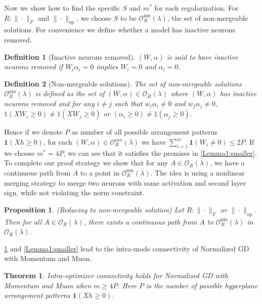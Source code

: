 \documentclass{article}
\newtheorem{theorem}{Theorem}[section]
\newtheorem{proposition}{Proposition}[section]
\newtheorem{definition}{Definition}[section]
\newcommand{\op}{\mathrm{op}}
\newcommand{\nm}{\mathrm{nm}}      %
\begin{document}
Now we show how to find the specific $S$ and $m^*$ for each regularization. For $R: \|\cdot\|_F$ and $\|\cdot\|_{\op}$, we choose $S$ to be $\mathcal{O}_R^{\nm}(\lambda)$, the set of non-mergeable solutions. For convenience we define whether a model has inactive neurons removed.
\begin{definition}[Inactive neurons removed]
$(W,\alpha)$ is said to have \emph{inactive neurons removed} if
\(W_i \alpha_i = 0\) implies \(W_i = 0\) and \(\alpha_i = 0\).
\end{definition}
\begin{definition}[Non-mergeable solutions]
The set of non-mergeable solutions $\mathcal{O}_R^{\nm}(\lambda)$ is defined as the set of $(W,\alpha) \in \mathcal{O}_R(\lambda)$ where $(W,\alpha)$ has inactive neurons removed and for any $i \neq j$ such that $w_i \alpha_i \neq 0$ and $w_j \alpha_j \neq 0$,
\(1(XW_i \ge 0) \neq 1(XW_j \ge 0)\) or \((\alpha_i \ge 0) \neq 1(\alpha_j \ge 0).\)
\end{definition}

Hence if we denote $P$ as number of all possible arrangement patterns $\mathbf{1}(Xh \ge 0)$, for each $(W, \alpha) \in \mathcal{O}_R^{nm}(\lambda)$ we have $\sum_{i=1}^m \mathbf{1}(W_i \ne 0) \le 2P$. If we choose $m^*=4P$, we can see that it satisfies the premises in \cref{Lemma1:smaller}. To complete our proof strategy we show that for any $A \in \mathcal{O}_R(\lambda)$, we have a continuous path from $A$ to a point in $\mathcal{O}_R^{\nm}(\lambda)$. The idea is using a nonlinear merging strategy to merge two neurons with same activation and second layer sign, while not violating the norm constraint.

\begin{proposition}
\label{prop3:reduction}
(Reducing to non-mergeable solution) Let $R: \|\cdot\|_F$ or $\|\cdot\|_{\op}$. Then for all $A \in \mathcal{O}_R(\lambda)$, there exists a continuous path from $A$ to $\mathcal{O}_R^{\nm}(\lambda)$ in $\mathcal{O}_R(\lambda)$.
\end{proposition}

\cref{prop3:reduction} and \cref{Lemma1:smaller} lead to the intra-mode connectivity of Normalized GD with Momentum and Muon.

\begin{theorem}
\label{t1:intramode_rot_31}
Intra-optimizer connectivity holds for Normalized GD with Momentum and Muon when $m \ge 4P$. Here $P$ is the number of possible hyperplane arrangement patterns $\mathbf{1}(Xh \ge 0)$. 
\end{theorem}
\end{document}
